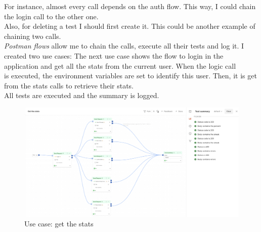For instance, almost every call depends on the auth flow. This way, I could chain the login call to the other one. \\
Also, for deleting a test I should first create it. This could be another example of chaining two calls. \\

\textit{Postman flows} allow me to chain the calls, execute all their tests and log it. I created two use cases:
The next use case shows the flow to login in the application and get all the stats from the current user. When the logic call \\
is executed, the environment variables are set to identify this user. Then, it is get from the stats calls to retrieve their stats. \\
All tests are executed and the summary is logged.
\begin{figure}[H]
    \centering
        \includegraphics[angle=90, width=\textwidth, height=\textheight]{assets/postman_getstats.png}
    \caption{Use case: get the stats}
    \label{fig:test_getstats}
\end{figure}

